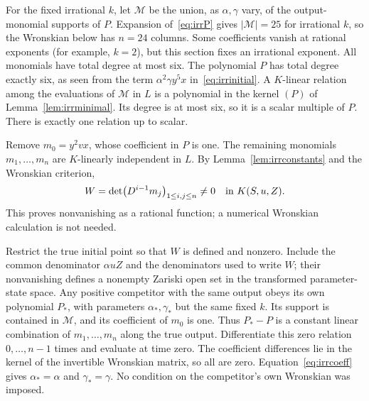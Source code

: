 \documentclass[10pt,a4paper]{article}
\theoremstyle{definition}\newtheorem{definition}[theorem]{Definition}
\begin{document}
For the fixed irrational $k$, let $\mathcal M$ be the union, as
$\alpha,\gamma$ vary, of the output-monomial supports of $P$.
Expansion of~\eqref{eq:irrP} gives $|\mathcal M|=25$ for irrational
$k$, so the Wronskian below has $n=24$ columns. Some coefficients
vanish at rational exponents (for example, $k=2$), but this section
fixes an irrational exponent. All monomials have total degree at
most six.
The polynomial $P$ has total degree exactly six, as seen from the
term $\alpha^2\gamma y^5x$ in~\eqref{eq:irrinitial}.
A $K$-linear relation among the evaluations of $\mathcal M$ in $L$
is a polynomial in the kernel $(P)$ of Lemma~\ref{lem:irrminimal}.
Its degree is at most six, so it is a scalar multiple of $P$.
There is exactly one relation up to scalar.

Remove $m_0=y^2vx$, whose coefficient in $P$ is one. The remaining
monomials $m_1,\ldots,m_n$ are $K$-linearly independent in $L$.
By Lemma~\ref{lem:irrconstants} and the Wronskian criterion,
\begin{equation}
W=\det\bigl(D^{i-1}m_j\bigr)_{1\leq i,j\leq n}\ne0
\quad\hbox{in }K(S,u,Z).
\label{eq:W}
\end{equation}
This proves nonvanishing as a rational function; a numerical
Wronskian calculation is not needed.

Restrict the true initial point so that $W$ is defined and nonzero.
Include the common denominator $\alpha uZ$ and the denominators used
to write $W$; their nonvanishing defines a nonempty Zariski open set
in the transformed parameter-state space. Any positive competitor
with the same output obeys its own polynomial $P_*$, with parameters
$\alpha_*,\gamma_*$ but the same fixed $k$. Its support is contained
in $\mathcal M$, and its coefficient of $m_0$ is one. Thus $P_*-P$
is a constant linear combination of $m_1,\ldots,m_n$ along the true
output. Differentiate this zero relation $0,\ldots,n-1$ times and
evaluate at time zero. The coefficient differences lie in the kernel
of the invertible Wronskian matrix, so all are zero.
Equation~\eqref{eq:irrcoeff} gives $\alpha_* =\alpha$ and
$\gamma_* =\gamma$. No condition on the competitor's own Wronskian
was imposed.
\end{document}
